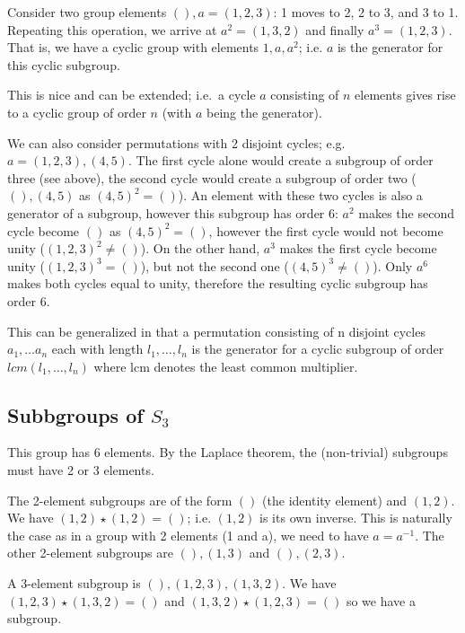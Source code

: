 

Consider two group elements \((), a = (1,2,3)\): 1 moves to 2, 2 to 3,
and 3 to 1. Repeating this operation, we arrive at \(a^2 = (1,3,2)\) and
finally \(a^3 = (1,2,3)\). That is, we have a cyclic group with elements
\(1, a, a^2\); i.e. \(a\) is the generator for this cyclic subgroup.

This is nice and can be extended; i.e.~a cycle \(a\) consisting of \(n\)
elements gives rise to a cyclic group of order \(n\) (with \(a\) being
the generator).

We can also consider permutations with 2 disjoint cycles; e.g.
\(a = (1,2,3),(4,5)\). The first cycle alone would create a subgroup of
order three (see above), the second cycle would create a subgroup of
order two (\((), (4,5)\) as \((4,5)^2 = ()\)). An element with these two
cycles is also a generator of a subgroup, however this subgroup has
order 6: \(a^2\) makes the second cycle become \(()\) as
\((4,5)^2 = ()\), however the first cycle would not become unity
(\((1,2,3)^2 \neq ()\)). On the other hand, \(a^3\) makes the first
cycle become unity (\((1,2,3)^3 = ()\)), but not the second one
(\((4,5)^3 \neq ()\)). Only \(a^6\) makes both cycles equal to unity,
therefore the resulting cyclic subgroup has order 6.

This can be generalized in that a permutation consisting of n disjoint
cycles \(a_1, \ldots a_n\) each with length \(l_1, \ldots, l_n\) is the
generator for a cyclic subgroup of order \(lcm(l_1, \ldots, l_n)\) where
lcm denotes the least common multiplier.

\subsection{Subbgroups of $S_3$}

This group has 6 elements. By the Laplace theorem, the (non-trivial)
subgroups must have 2 or 3 elements.

The 2-element subgroups are of the form \(()\) (the identity element)
and \((1,2)\). We have \((1,2) \star (1,2) = ()\); i.e. \((1,2)\) is its
own inverse. This is naturally the case as in a group with 2 elements (1
and a), we need to have \(a=a^{-1}\). The other 2-element subgroups are
\((), (1,3)\) and \((), (2,3)\).

A 3-element subgroup is \((), (1,2,3), (1,3,2)\). We have
\((1,2,3) \star (1,3,2) = ()\) and \((1,3,2) \star (1,2,3) = ()\) so we
have a subgroup.

